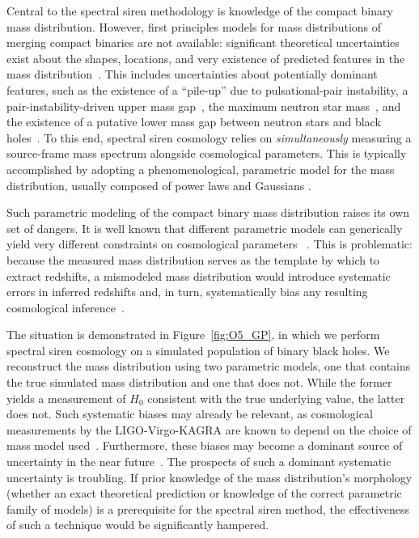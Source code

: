 \documentclass[preprint2,linenumbers]{aastex631}
\begin{document}
Central to the spectral siren methodology is knowledge of the compact binary mass distribution.
However, first principles models for mass distributions of merging compact binaries are not available: significant theoretical uncertainties exist about the shapes, locations, and very existence of predicted features in the mass distribution~\citep[e.g.][]{ zevin_constraining_2017, mapelli_binary_2020,2021ApJ...910..152Z,marchant_evolution_2023}.
This includes uncertainties about potentially dominant features, such as the existence of a ``pile-up'' due to pulsational-pair instability, a pair-instability-driven upper mass gap~\citep{farmer_mind_2019}, the maximum neutron star mass~\citep{fryer_theoretical_2001, alsing_evidence_2018}, and the existence of a putative lower mass gap between neutron stars and black holes~\citep{ozel_black_2010, farr_mass_2011, farah_bridging_2022}.
To this end, spectral siren cosmology relies on \textit{simultaneously} measuring a source-frame mass spectrum alongside cosmological parameters.
This is typically accomplished by adopting a phenomenological, parametric model for the mass distribution, usually composed of power laws and Gaussians \citep[e.g.][]{gwtc3_cosmo,mastrogiovanni_icarogw_2023}.

Such parametric modeling of the compact binary mass distribution raises its own set of dangers.
It is well known that different parametric models can generically yield very different constraints on cosmological parameters ~\citep{abbott_population_2021,abbott_population_2023}.
This is problematic: because the measured mass distribution serves as the template by which to extract redshifts, a mismodeled mass distribution would introduce systematic errors in inferred redshifts and, in turn, systematically bias any resulting cosmological inference~\citep{ezquiaga_spectral_2022,Mukherjee:2021rtw,mastrogiovanni_importance_2021,pierra_study_2023}.

The situation is demonstrated in Figure~\ref{fig:O5_GP}, in which we perform spectral siren cosmology on a simulated population of binary black holes.
We reconstruct the mass distribution using two parametric models, one that contains the true simulated mass distribution and one that does not.
While the former yields a measurement of $H_0$ consistent with the true underlying value, the latter does not.
Such systematic biases may already be relevant, as cosmological measurements by the LIGO-Virgo-KAGRA are known to depend on the choice of mass model used~\citep{gwtc3_cosmo}.
Furthermore, these biases may become a dominant source of uncertainty in the near future~\citep{pierra_study_2023}.
The prospects of such a dominant systematic uncertainty is troubling.
If prior knowledge of the mass distribution's morphology (whether an exact theoretical prediction or knowledge of the correct parametric family of models) is a prerequisite for the spectral siren method, the effectiveness of such a technique would be significantly hampered.
\end{document}
